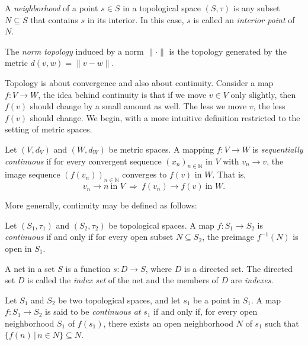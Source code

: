 \begin{definition}
A \emph{neighborhood} of a point \( s \in S \) in a topological space $(S, \tau)$ is any subset \( N \subseteq S  \) that contains \( s \) in its interior. In this case, \( s \) is called an \emph{interior point} of \( N \). 
\end{definition}

\begin{definition}
  The \emph{norm topology} induced by a norm $\|\cdot\|$ is the topology generated by the metric $d(v, w) = \|v - w\|$.
\end{definition}

Topology is about convergence and also about continuity. Consider a  map $f \colon V \to W$, the idea behind continuity is that if we move $v \in V$ only slightly, then $f(v)$ should change by a small amount as well. The less we move $v$, the less $f(v)$ should change. We begin, with a more intuitive definition restricted to the setting of metric spaces.

\begin{definition}
Let $(V,d_V)$ and $(W,d_W)$ be metric spaces. A mapping $f \colon V \to W$ is \emph{sequentially continuous} if for every convergent sequence $(x_n)_{n\in\mathbb{N}}$ in $V$ with $v_n \to v$, the image sequence $(f(v_n))_{n\in\mathbb{N}}$ converges to $f(v)$ in $W$. That is,
\[
v_n \to n \ \text{in } V \ \Rightarrow \ f(v_n) \to f(v) \ \text{in } W.
\]
\end{definition}
More generally, continuity may be defined as follows:
\begin{definition}
  Let $(S_1, \tau_1)$ and $(S_2, \tau_2)$ be topological spaces. A map $f \colon S_1 \to S_2$ is \emph{continuous} if and only if for every open subset $N \subseteq S_2$, the preimage $f^{-1}(N)$ is open in $S_1$.
\end{definition}

\begin{definition}
A net in a set $S$ is a function $s \colon D \to S$, where $D$ is a directed set. The directed set $D$ is called the \emph{index set} of the net and the members of $D$ are \emph{indexes}.
\end{definition}

\begin{definition}
  Let \( S_1 \) and \( S_2 \) be two topological spaces, and let \( s_1 \) be a point in \( S_1 \).  
A map \( f : S_1 \to S_2 \) is said to be \emph{continuous at} \( s_1 \) if and only if, for every open neighborhood \( S_1 \) of \( f(s_1) \), there exists an open neighborhood \( N \) of \( s_1 \) such that  
$
\{f(n) \, |\, n \in N \} \subseteq N.
$
\end{definition}





